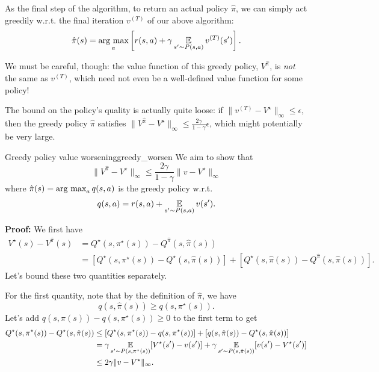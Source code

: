 \documentclass[\main/main]{subfiles}
\begin{document}
As the final step of the algorithm, to return an actual policy $\hat \pi$, we can simply act greedily w.r.t. the final iteration $v^{(T)}$ of our above algorithm:
\[
    \hat \pi(s) = \operatorname*{\textrm{arg\ max}}_a \left[ r(s, a) + \gamma \operatorname*{\mathbb{E}}_{s' \sim P(s, a)} v^{(T)}(s') \right].
\]

We must be careful, though: the value function of this greedy policy, $V^{\hat \pi}$, is \emph{not} the same as $v^{(T)}$, which need not even be a well-defined value function for some policy!

The bound on the policy's quality is actually quite loose: if $\|v^{(T)} - V^\star\|_{\infty} \le \epsilon$, then the greedy policy $\hat \pi$ satisfies $\|V^{\hat \pi} - V^\star\|_{\infty} \le \frac{2\gamma}{1-\gamma} \epsilon$, which might potentially be very large.

\begin{theorem}{Greedy policy value worsening}{greedy_worsen}
    We aim to show that
    \[
        \|V^{\hat \pi} - V^\star \|_{\infty} \le \frac{2 \gamma}{1-\gamma} \|v - V^\star\|_{\infty}
    \]
    where $\hat \pi(s) = \operatorname*{\textrm{arg\ max}}_a q(s, a)$ is the greedy policy w.r.t. \[ q(s, a) = r(s, a) + \operatorname*{\mathbb{E}}_{s' \sim P(s, a)} v(s'). \]

    \textbf{Proof:} We first have
    \begin{align*}
        V^{\star}(s) - V^{\hat \pi}(s) &= Q^{\star}(s,\pi^\star(s)) - Q^{\hat \pi}(s, \hat \pi(s))\\
        &= [Q^{\star}(s,\pi^\star(s)) - Q^{\star}(s, \hat \pi(s))] + [Q^{\star}(s, \hat \pi(s)) - Q^{\hat \pi}(s, \hat \pi(s))].
    \end{align*}
    Let's bound these two quantities separately.

    For the first quantity, note that by the definition of $\hat \pi$, we have
    \[ q(s, \hat \pi(s)) \ge q(s,\pi^\star(s)). \]
    Let's add $q(s, \hat \pi(s)) - q(s,\pi^\star(s)) \ge 0$ to the first term to get
    \begin{align*}
        Q^{\star}(s,\pi^\star(s)) - Q^{\star}(s, \hat \pi(s)) &\le [Q^{\star}(s,\pi^\star(s))- q(s,\pi^\star(s))] + [q(s, \hat \pi(s)) - Q^{\star}(s, \hat \pi(s))] \\
        &= \gamma \operatorname*{\mathbb{E}}_{s' \sim P(s, \pi^{\star}(s))} [ V^{\star}(s') - v(s') ] + \gamma \operatorname*{\mathbb{E}}_{s' \sim P(s, \hat \pi(s))} [ v(s') - V^{\star}(s') ] \\
        &\le 2 \gamma \|v - V^{\star}\|_{\infty}.
    \end{align*}


\end{theorem}
\end{document}
